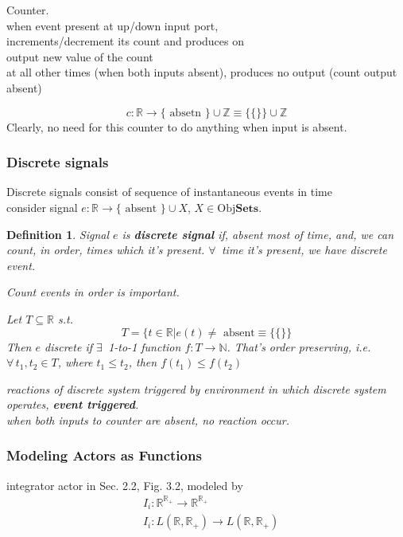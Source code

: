 \documentclass[10pt]{amsart}
\newtheorem{definition}{Definition}
\begin{document}
\begin{multicols*}{2}
Counter.  \\
when event present at up/down input port, \\
increments/decrement its count and produces on \\
output new value of the count \\
at all other times (when both inputs absent), produces no output (count output absent)

\[
c:\mathbb{R} \to \lbrace \text{ absetn } \rbrace \cup \mathbb{Z} \equiv \lbrace \lbrace \rbrace \rbrace \cup \mathbb{Z}
\]
Clearly, no need for this counter to do anything when input is absent.  

\subsubsection{Discrete signals}

Discrete signals consist of sequence of instantaneous events in time \\
consider signal $e: \mathbb{R} \to \lbrace \text{ absent } \rbrace \cup X$, $X \in \text{Obj}\textbf{Sets}$.  

\begin{definition}
Signal $e$ is \textbf{discrete signal} if, absent most of time, and, we can count, in order, times which it's present.  $\forall \, $ time it's present, we have discrete event.   

Count events in order is important.  

Let $T \subseteq \mathbb{R}$ s.t. 
\[
T = \lbrace t\in \mathbb{R} | e(t) \neq \text{ absent} \equiv \lbrace \lbrace \rbrace \rbrace 
\]
Then $e$ discrete if $\exists \, $ 1-to-1 function $f: T \to \mathbb{N}$.  That's order preserving, i.e. $\forall \, t_1,t_2 \in T$, where $t_1 \leq t_2$, then $f(t_1) \leq f(t_2)$  

reactions of discrete system triggered by environment in which discrete system operates, \textbf{ event triggered}.  \\

when both inputs to counter are absent, no reaction occur.  
\end{definition}

\subsubsection{Modeling Actors as Functions}

integrator actor in Sec. 2.2, Fig. 3.2, modeled by 
\[
\begin{aligned}
& I_i : \mathbb{R}^{\mathbb{R}_+} \to \mathbb{R}^{\mathbb{R}_+} \\ 
&  I_i : L(\mathbb{R}, \mathbb{R}_+ ) \to L(\mathbb{R}, \mathbb{R}_+)
\end{aligned}
\]


\end{multicols*}
\end{document}
